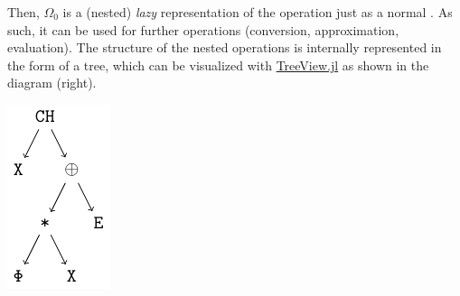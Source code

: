 \begin{minipage}{0.69\linewidth}
Then, $\Omega_0$ is a (nested) \emph{lazy} representation of the  operation just as a normal . As such, it can be used for further operations (conversion, approximation, evaluation). The structure of the nested operations is internally represented in the form of a tree, which can be visualized with \href{https://github.com/JuliaTeX/TreeView.jl}{TreeView.jl} as shown in the diagram (right).
\end{minipage}
\hfill
\begin{minipage}{0.2\linewidth}
		\includegraphics[width=\linewidth, keepaspectratio]{img/ast}
\end{minipage}

